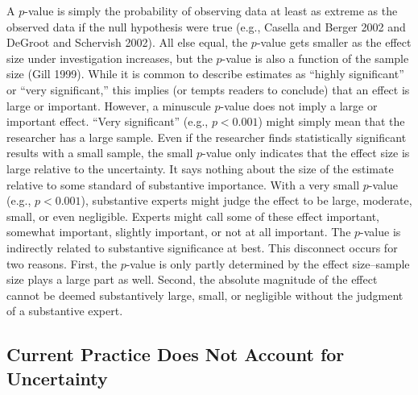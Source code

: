 \documentclass[12pt]{article}
\begin{document}
A $p$-value is simply the probability of observing data at least as extreme as the observed data if the null hypothesis were true (e.g., Casella and Berger 2002 and DeGroot and Schervish 2002). All else equal, the $p$-value gets smaller as the effect size under investigation increases, but the $p$-value is also a function of the sample size (Gill 1999). While it is common to describe estimates as ``highly significant'' or ``very significant,'' this implies (or tempts readers to conclude) that an effect is large or important. However, a minuscule $p$-value does not imply a large or important effect. ``Very significant'' (e.g., $p < 0.001$) might simply mean that the researcher has a large sample. Even if the researcher finds statistically significant results with a small sample, the small $p$-value only indicates that the effect size is large relative to the uncertainty. It says nothing about the size of the estimate relative to some standard of substantive importance. With a very small $p$-value (e.g., $p < 0.001$), substantive experts might judge the effect to be large, moderate, small, or even negligible. Experts might call some of these effect important, somewhat important, slightly important, or not at all important. The $p$-value is indirectly related to substantive significance at best. This disconnect occurs for two reasons. First, the $p$-value is only partly determined by the effect size--sample size plays a large part as well. Second, the absolute magnitude of the effect cannot be deemed substantively large, small, or negligible without the judgment of a substantive expert.

\subsection*{Current Practice Does Not Account for Uncertainty}
\end{document}
